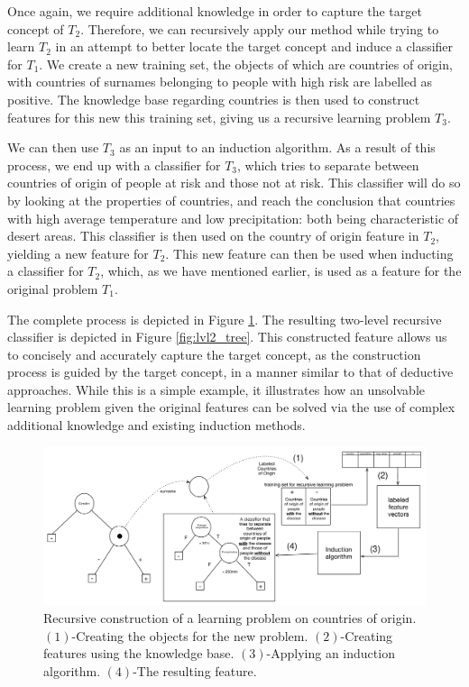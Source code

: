\documentclass[twoside,11pt]{article}
\theoremstyle{definition}
\begin{document}
Once again, we require additional knowledge in order to capture the target concept of $T_2$. 
Therefore, we can recursively apply our method while trying to learn $T_2$ in an attempt to better locate the target concept and induce a classifier for $T_1$.
We create a new training set, the objects of which are countries of origin, with countries of surnames belonging to people with high risk are labelled as positive. The knowledge base regarding countries is then used to construct features for this new this training set, giving us a recursive learning problem $T_3$.

We can then use $T_3$ as an input to an induction algorithm. As a result of this process, we end up with a classifier for $T_3$, which tries to separate between countries of origin of people at risk and those not at risk. This classifier will do so by looking at the properties of countries, and reach the conclusion that countries with high average temperature and low precipitation: both being characteristic of desert areas.
This classifier is then used on the country of origin feature in $T_2$, yielding a new feature for $T_2$.  This new feature can then be used when inducting a classifier for $T_2$, which, as we have mentioned earlier, is used as a feature for the original problem $T_1$.

The complete process is depicted in Figure \ref{fig:moving_to_lvl2}. The resulting two-level recursive classifier is depicted in Figure \ref{fig:lvl2_tree}. This constructed feature allows us to concisely and accurately capture the target concept, as the construction process is guided by the target concept, in a manner similar to that of deductive approaches.
While this is a simple example, it illustrates how an unsolvable learning problem given the original features can be solved via the use of complex additional knowledge and existing induction methods.


\begin{figure}[t]
	\centering
	\includegraphics[width=\linewidth]{fig4_annotated.pdf}
	\caption{Recursive construction of a learning problem on countries of origin. $(1)$-Creating the objects for the new problem. $(2)$-Creating features using the knowledge base. $(3)$-Applying an induction algorithm. $(4)$-The resulting feature.}
	\label{fig:moving_to_lvl2}
\end{figure}
\end{document}
